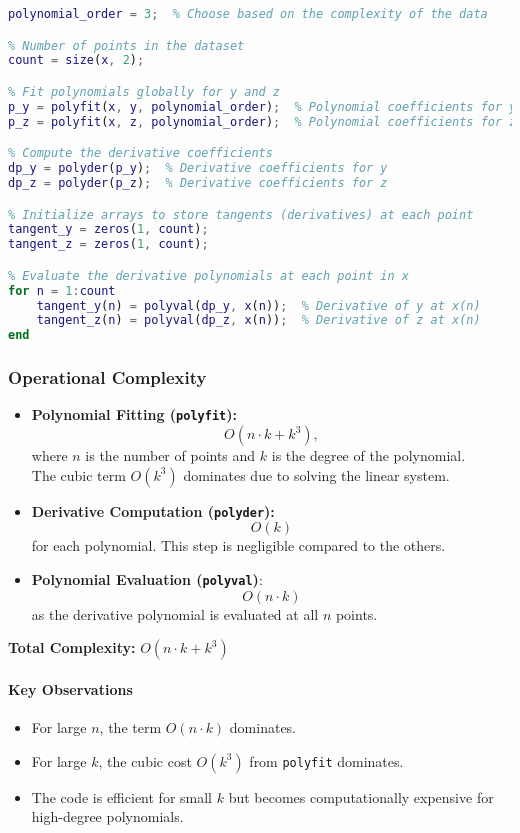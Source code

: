 \documentclass[a4paper]{article}
\begin{document}
\begin{lstlisting}[language=matlab]
% Degree of the polynomial fit
polynomial_order = 3;  % Choose based on the complexity of the data

% Number of points in the dataset
count = size(x, 2);

% Fit polynomials globally for y and z
p_y = polyfit(x, y, polynomial_order);  % Polynomial coefficients for y
p_z = polyfit(x, z, polynomial_order);  % Polynomial coefficients for z

% Compute the derivative coefficients
dp_y = polyder(p_y);  % Derivative coefficients for y
dp_z = polyder(p_z);  % Derivative coefficients for z

% Initialize arrays to store tangents (derivatives) at each point
tangent_y = zeros(1, count);
tangent_z = zeros(1, count);

% Evaluate the derivative polynomials at each point in x
for n = 1:count
    tangent_y(n) = polyval(dp_y, x(n));  % Derivative of y at x(n)
    tangent_z(n) = polyval(dp_z, x(n));  % Derivative of z at x(n)
end
\end{lstlisting}

\subsubsection*{Operational Complexity}
\begin{itemize}
    \item \textbf{Polynomial Fitting (\texttt{polyfit}):} 
    \[O(n \cdot k + k^3),\]
     where \( n \) is the number of points and \( k \) is the degree of the polynomial.\\
    The cubic term \( O(k^3) \) dominates due to solving the linear system.

    \item \textbf{Derivative Computation (\texttt{polyder}):}
    \[O(k)\] for each polynomial.
    This step is negligible compared to the others.

    \item \textbf{Polynomial Evaluation (\texttt{polyval})}:
    \[O(n \cdot k)\]
    as the derivative polynomial is evaluated at all \( n \) points.
\end{itemize}

\textbf{Total Complexity:} \(O(n \cdot k + k^3)\)

\paragraph*{Key Observations}
\begin{itemize}
    \item For large \( n \), the term \( O(n \cdot k) \) dominates.
    \item For large \( k \), the cubic cost \( O(k^3) \) from \texttt{polyfit} dominates.
    \item The code is efficient for small \( k \) but becomes computationally expensive for high-degree polynomials.
\end{itemize}
\end{document}
